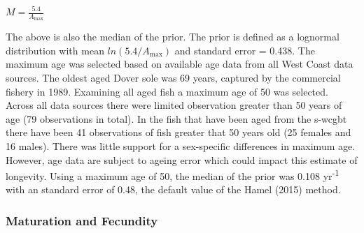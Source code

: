 \documentclass[11pt,
  english,
  a4paper,
]{article}
\begin{document}
\leavevmode\tagmcend\tagstructend\par

\begin{centering}

$M=\frac{5.4}{A_{\text{max}}}$

\end{centering}


The above is also the median of the prior. The prior is defined as a lognormal distribution with mean {\(ln(5.4/A_{\text{max}})\)\leavevmode\tagmcend\tagstructend} and standard error = 0.438. The maximum age was selected based on available age data from all West Coast data sources. The oldest aged Dover sole was 69 years, captured by the commercial fishery in 1989. Examining all aged fish a maximum age of 50 was selected. Across all data sources there were limited observation greater than 50 years of age (79 observations in total). In the fish that have been aged from the \Gls{s-wcgbt} there have been 41 observations of fish greater that 50 years old (25 females and 16 males). There was little support for a sex-specific differences in maximum age. However, age data are subject to ageing error which could impact this estimate of longevity. Using a maximum age of 50, the median of the prior was 0.108 yr\textsuperscript{-1} with an standard error of 0.48, the default value of the Hamel {(2015)\leavevmode\tagmcend\tagstructend} method.

\leavevmode\tagmcend\tagstructend\par


\hypertarget{maturation-and-fecundity}{%
\subsubsection{Maturation and Fecundity}\label{maturation-and-fecundity}}

\leavevmode\tagmcend\tagstructend

\end{document}
